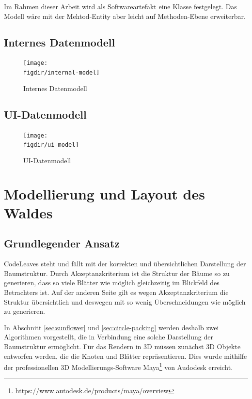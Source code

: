 Im Rahmen dieser Arbeit wird als Softwareartefakt eine Klasse festgelegt. Das Modell wäre mit der Mehtod-Entity aber leicht auf Methoden-Ebene erweiterbar.

\section{Internes Datenmodell}
\label{sec:app-model}

\begin{figure}[htb]
  \texttt{[image: \\figdir/internal-model]}
  \caption{Internes Datenmodell}
  \label{fig:internal-model}
\end{figure}

\section{UI-Datenmodell}
\label{sec:hierarchical-model}

\begin{figure}[htb]
  \texttt{[image: \\figdir/ui-model]}
  \caption{UI-Datenmodell}
  \label{fig:ui-model}
\end{figure}

\chapter{Modellierung und Layout des Waldes}
\label{ch:layout}

\section{Grundlegender Ansatz}

CodeLeaves steht und fällt mit der korrekten und übersichtlichen Darstellung der Baumstruktur. Durch Akzeptanzkriterium  ist die Struktur der Bäume so zu generieren, dass so viele Blätter wie möglich gleichzeitig im Blickfeld des Betrachters ist. Auf der anderen Seite gilt es wegen Akzeptanzkriterium  die Struktur übersichtlich und deswegen mit so wenig Überschneidungen wie möglich zu generieren.

In Abschnitt \ref{sec:sunflower} und \ref{sec:circle-packing} werden deshalb zwei Algorithmen vorgestellt, die in Verbindung eine solche Darstellung der Baumstruktur ermöglicht. Für das Rendern in 3D müssen zunächst 3D Objekte entworfen werden, die die Knoten und Blätter repräsentieren. Dies wurde mithilfe der professionellen 3D Modellierungs-Software Maya\footnote{https://www.autodesk.de/products/maya/overview} von Audodesk erreicht.

